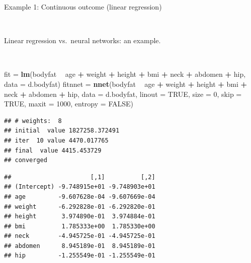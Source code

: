 \documentclass[10pt,ignorenonframetext,]{beamer}
\newenvironment{Shaded}{\begin{snugshade}}{\end{snugshade}}
\newcommand{\DataTypeTok}[1]{\textcolor[rgb]{0.13,0.29,0.53}{#1}}
\newcommand{\DecValTok}[1]{\textcolor[rgb]{0.00,0.00,0.81}{#1}}
\newcommand{\KeywordTok}[1]{\textcolor[rgb]{0.13,0.29,0.53}{\textbf{#1}}}
\newcommand{\NormalTok}[1]{#1}
\newcommand{\OperatorTok}[1]{\textcolor[rgb]{0.81,0.36,0.00}{\textbf{#1}}}
\newcommand{\OtherTok}[1]{\textcolor[rgb]{0.56,0.35,0.01}{#1}}
\newcommand{\StringTok}[1]{\textcolor[rgb]{0.31,0.60,0.02}{#1}}
\begin{document}
\begin{frame}[fragile]

\begin{block}{Example 1: Continuous outcome (linear regression)}

\(~\)

Linear regression vs.~neural networks: an example.

\(~\)

\scriptsize

\begin{Shaded}
\begin{Highlighting}[]
\NormalTok{fit =}\StringTok{ }\KeywordTok{lm}\NormalTok{(bodyfat }\OperatorTok{~}\StringTok{ }\NormalTok{age }\OperatorTok{+}\StringTok{ }\NormalTok{weight }\OperatorTok{+}\StringTok{ }\NormalTok{height }\OperatorTok{+}\StringTok{ }\NormalTok{bmi }\OperatorTok{+}\StringTok{ }\NormalTok{neck }\OperatorTok{+}\StringTok{ }\NormalTok{abdomen }\OperatorTok{+}\StringTok{ }\NormalTok{hip, }
    \DataTypeTok{data =}\NormalTok{ d.bodyfat)}
\NormalTok{fitnnet =}\StringTok{ }\KeywordTok{nnet}\NormalTok{(bodyfat }\OperatorTok{~}\StringTok{ }\NormalTok{age }\OperatorTok{+}\StringTok{ }\NormalTok{weight }\OperatorTok{+}\StringTok{ }\NormalTok{height }\OperatorTok{+}\StringTok{ }\NormalTok{bmi }\OperatorTok{+}\StringTok{ }\NormalTok{neck }\OperatorTok{+}\StringTok{ }\NormalTok{abdomen }\OperatorTok{+}\StringTok{ }
\StringTok{    }\NormalTok{hip, }\DataTypeTok{data =}\NormalTok{ d.bodyfat, }\DataTypeTok{linout =} \OtherTok{TRUE}\NormalTok{, }\DataTypeTok{size =} \DecValTok{0}\NormalTok{, }\DataTypeTok{skip =} \OtherTok{TRUE}\NormalTok{, }\DataTypeTok{maxit =} \DecValTok{1000}\NormalTok{, }
    \DataTypeTok{entropy =} \OtherTok{FALSE}\NormalTok{)}
\end{Highlighting}
\end{Shaded}

\begin{verbatim}
## # weights:  8
## initial  value 1827258.372491 
## iter  10 value 4470.017765
## final  value 4415.453729 
## converged
\end{verbatim}

\begin{Shaded}
\end{Shaded}

\begin{verbatim}
##                      [,1]          [,2]
## (Intercept) -9.748915e+01 -9.748903e+01
## age         -9.607628e-04 -9.607669e-04
## weight      -6.292828e-01 -6.292820e-01
## height       3.974890e-01  3.974884e-01
## bmi          1.785333e+00  1.785330e+00
## neck        -4.945725e-01 -4.945725e-01
## abdomen      8.945189e-01  8.945189e-01
## hip         -1.255549e-01 -1.255549e-01
\end{verbatim}

\end{block}

\end{frame}
\end{document}
